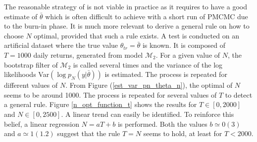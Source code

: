 \documentclass[11pt,a4,twosided,singlespacing,titlepagenumber=on]{scrreprt}
\numberwithin{equation}{chapter} %
\theoremstyle{remark}
\begin{document}
The reasonable strategy of \cite{pitt2012} is not viable in practice as it requires to have a good estimate of $\bar{\theta}$ which is often difficult to achieve with a short run of PMCMC due to the burn-in phase. It is much more relevant to derive a general rule on how to choose $N$ optimal, provided that such a rule exists. A test is conducted on an artificial dataset where the true value $\theta_{tr} = \bar{\theta}$ is known. It is composed of $T=1000$ daily returns, generated from model $\mathcal{M}_2$. For a given value of $N$, the bootstrap filter of $\mathcal{M}_2$ is called several times and the variance of the log likelihoods Var$(\log p_N(y|\bar{\theta}))$ is estimated. The process is repeated for different values of $N$. From Figure (\ref{est_var_pn_theta_n}), the optimal of $N$ seems to be around 1000. The process is repeated for several values of $T$ to detect a general rule. Figure \ref{n_opt_function_t} shows the results for $T \in [0, 2000]$ and $N \in [0, 2500]$. A linear trend can easily be identified. To reinforce this belief, a linear regression $N = a T + b$ is performed. Both the values $b \simeq 0 (3)$ and $a \simeq 1 (1.2)$ suggest that the rule $T = N$ seems to hold, at least for $T < 2000$.
\end{document}

